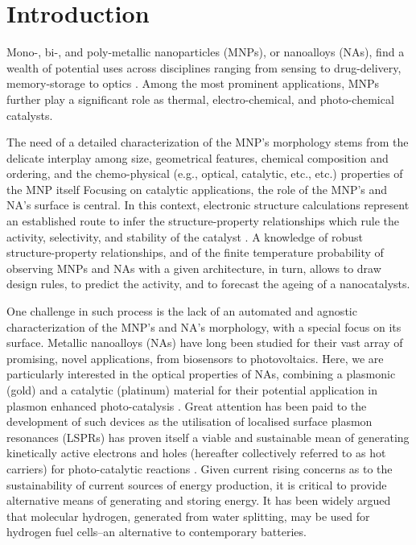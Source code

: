 \section{Introduction}
Mono-, bi-, and poly-metallic nanoparticles (MNPs), or nanoalloys (NAs), find a wealth of potential uses across disciplines ranging from sensing \cite{BioSensors,10.3389/fchem.2020.00341} to drug-delivery,\cite{RAHMAN2021107} memory-storage \cite{https://doi.org/10.1002/nano.202000268,Ditlbacher:00} 
to optics \cite{doi:10.1021/jp026731y,C1NR10788G}.
%
Among the most prominent applications, MNPs further play a significant role as thermal,\cite{doi:10.1021/acs.accounts.8b00521,D0CS00357C,LORBER2022104107} electro-chemical,\cite{C5NR02298C,doi:10.1021/acs.nanolett.9b01523} and photo-chemical \cite{doi:10.1021/acscatal.1c01519,doi:10.1021/ar500411s} catalysts. 
%

The need of a detailed characterization of the MNP's morphology stems from the delicate interplay among size, geometrical features, chemical composition and ordering, and the chemo-physical (e.g., optical, catalytic, etc., etc.) properties of the MNP itself \cite{HotCarrierCreation_Structure,AuPlasmonRev,BioSensors,ExtractHotCars} 
Focusing on catalytic applications, the role of the MNP's and NA's surface is central.
In this context, electronic structure calculations represent an established route to infer the structure-property relationships which rule the activity, selectivity, and stability of the catalyst \cite{Hong2019, Guo2020,Jagannath2018,Chen2021}.
A knowledge of robust structure-property relationships, and of the finite temperature probability of observing MNPs and NAs with a given architecture, in turn, allows to draw design rules, to predict the activity, and to forecast the ageing of a nanocatalysts.

One challenge in such process is the lack of an automated and agnostic characterization of the MNP's and NA's morphology, with a special focus on its surface. 
%
Metallic nanoalloys (NAs) have long been studied for their vast array of promising, novel applications, from biosensors to photovoltaics. Here, we are particularly interested in the optical properties of NAs, combining a plasmonic (gold) and a catalytic (platinum) material for their potential application in plasmon enhanced photo-catalysis \cite{H2Dissociate,MoreH2Dissociate}. Great attention has been paid to the development of such devices as the utilisation of localised surface plasmon resonances (LSPRs) has proven itself a viable and sustainable mean of generating kinetically active electrons and holes (hereafter collectively referred to as hot carriers) for photo-catalytic reactions \cite{HotCarrierCreation_Structure,AuPlasmonRev,BioSensors,ExtractHotCars}. Given current rising concerns as to the sustainability of current sources of energy production, it is critical to provide alternative means of generating and storing energy. It has been widely argued that molecular hydrogen, generated from water splitting, may be used for hydrogen fuel cells--an alternative to contemporary batteries.

